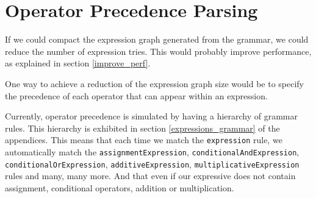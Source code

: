 


\section{Operator Precedence Parsing}
\label{perf_opprec}

If we could compact the expression graph generated from the grammar, we could
reduce the number of expression tries. This would probably improve performance,
as explained in section \ref{improve_perf}.

One way to achieve a reduction of the expression graph size would be to specify
the precedence of each operator that can appear within an expression.

Currently, operator precedence is simulated by having a hierarchy of grammar
rules. This hierarchy is exhibited in section \ref{expressions_grammar} of the
appendices. This means that each time we match the \texttt{expression} rule, we
automatically match the \texttt{assignmentExpression},
\texttt{conditionalAndExpression}, \texttt{conditionalOrExpression},
\texttt{additiveExpression}, \texttt{multiplicativeExpression} rules and many,
many more. And that even if our expressive does not contain assignment,
conditional operators, addition or multiplication.

